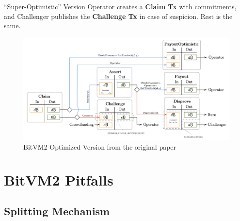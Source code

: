 \documentclass{zkdl-presentation-template}
\begin{document}
      \begin{frame}{``Super-Optimistic'' Version}  
        Operator creates a \textbf{Claim Tx} with commitments, and Challenger publishes the \textbf{Challenge Tx} in case of suspicion. Rest is the same.

        \begin{figure}
            \centering
            \includegraphics[width=\linewidth]{images/bitvm_optimized.png}
            \caption{BitVM2 Optimized Version from the original paper}
            \label{fig:bitvm2_optimized}
        \end{figure}
      \end{frame}

    \section{BitVM2 Pitfalls}

    \subsection{Splitting Mechanism}
\end{document}
